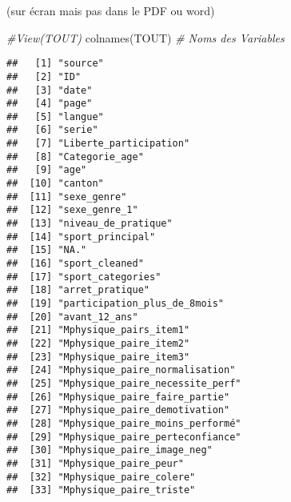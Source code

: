 \documentclass[
]{article}
\newenvironment{Shaded}{\begin{snugshade}}{\end{snugshade}}
\newcommand{\CommentTok}[1]{\textcolor[rgb]{0.56,0.35,0.01}{\textit{#1}}}
\newcommand{\FunctionTok}[1]{\textcolor[rgb]{0.00,0.00,0.00}{#1}}
\newcommand{\NormalTok}[1]{#1}
\begin{document}
(sur écran mais pas dans le PDF ou word)

\begin{Shaded}
\begin{Highlighting}[]
\CommentTok{\#View(TOUT)}
\FunctionTok{colnames}\NormalTok{(TOUT)   }\CommentTok{\# Noms des Variables}
\end{Highlighting}
\end{Shaded}

\begin{verbatim}
##   [1] "source"                                              
##   [2] "ID"                                                  
##   [3] "date"                                                
##   [4] "page"                                                
##   [5] "langue"                                              
##   [6] "serie"                                               
##   [7] "Liberte_participation"                               
##   [8] "Categorie_age"                                       
##   [9] "age"                                                 
##  [10] "canton"                                              
##  [11] "sexe_genre"                                          
##  [12] "sexe_genre_1"                                        
##  [13] "niveau_de_pratique"                                  
##  [14] "sport_principal"                                     
##  [15] "NA."                                                 
##  [16] "sport_cleaned"                                       
##  [17] "sport_categories"                                    
##  [18] "arret_pratique"                                      
##  [19] "participation_plus_de_8mois"                         
##  [20] "avant_12_ans"                                        
##  [21] "Mphysique_pairs_item1"                               
##  [22] "Mphysique_paire_item2"                               
##  [23] "Mphysique_paire_item3"                               
##  [24] "Mphysique_paire_normalisation"                       
##  [25] "Mphysique_paire_necessite_perf"                      
##  [26] "Mphysique_paire_faire_partie"                        
##  [27] "Mphysique_paire_demotivation"                        
##  [28] "Mphysique_paire_moins_performé"                      
##  [29] "Mphysique_paire_perteconfiance"                      
##  [30] "Mphysique_paire_image_neg"                           
##  [31] "Mphysique_paire_peur"                                
##  [32] "Mphysique_paire_colere"                              
##  [33] "Mphysique_paire_triste"                              

\end{verbatim}
\end{document}
